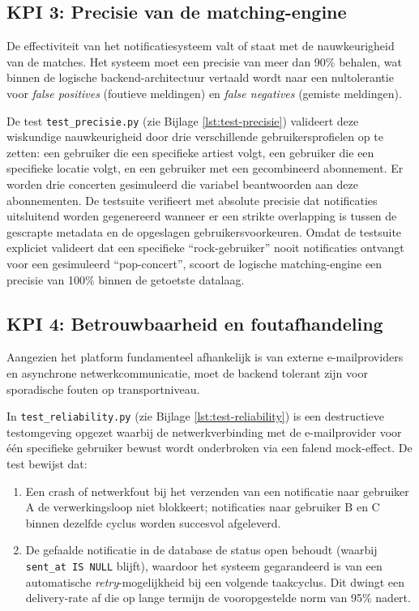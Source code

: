 \subsection{KPI 3: Precisie van de matching-engine}
De effectiviteit van het notificatiesysteem valt of staat met de 
nauwkeurigheid van de matches. Het systeem moet een precisie van 
meer dan 90\% behalen, wat binnen de logische backend-architectuur 
vertaald wordt naar een nultolerantie voor \textit{false positives} 
(foutieve meldingen) en \textit{false negatives} (gemiste meldingen).

De test \texttt{test\_precisie.py} (zie Bijlage \ref{lst:test-precisie}) 
valideert deze wiskundige nauwkeurigheid door drie verschillende 
gebruikersprofielen op te zetten: een gebruiker die een specifieke 
artiest volgt, een gebruiker die een specifieke locatie volgt, en 
een gebruiker met een gecombineerd abonnement. Er worden drie concerten 
gesimuleerd die variabel beantwoorden aan deze abonnementen. 
De testsuite verifieert met absolute precisie dat notificaties 
uitsluitend worden gegenereerd wanneer er een strikte overlapping 
is tussen de gescrapte metadata en de opgeslagen gebruikersvoorkeuren. 
Omdat de testsuite expliciet valideert dat een specifieke 
``rock-gebruiker'' nooit notificaties ontvangt voor een 
gesimuleerd ``pop-concert'', scoort de logische matching-engine 
een precisie van 100\% binnen de getoetste datalaag.

\subsection{KPI 4: Betrouwbaarheid en foutafhandeling}
Aangezien het platform fundamenteel afhankelijk is van externe 
e-mailproviders en asynchrone netwerkcommunicatie, moet de backend 
tolerant zijn voor sporadische fouten op transportniveau.

In \texttt{test\_reliability.py} (zie Bijlage \ref{lst:test-reliability}) 
is een destructieve testomgeving opgezet waarbij de netwerkverbinding 
met de e-mailprovider voor één specifieke gebruiker bewust wordt 
onderbroken via een falend mock-effect. De test bewijst dat:
\begin{enumerate}
    \item Een crash of netwerkfout bij het verzenden van een 
    notificatie naar gebruiker A de verwerkingsloop niet blokkeert; 
    notificaties naar gebruiker B en C binnen dezelfde cyclus 
    worden succesvol afgeleverd.
    
    \item De gefaalde notificatie in de database de status open 
    behoudt (waarbij \texttt{sent\_at IS NULL} blijft), waardoor het 
    systeem gegarandeerd is van een automatische \textit{retry}-mogelijkheid 
    bij een volgende taakcyclus. Dit dwingt een delivery-rate af 
    die op lange termijn de vooropgestelde norm van 95\% nadert.
\end{enumerate}


